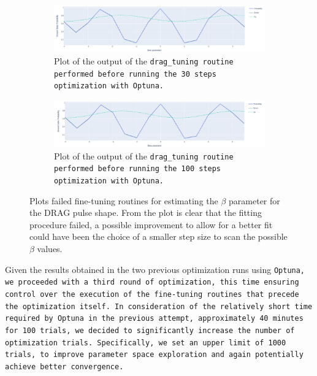 \begin{figure}[h!]
    \centering
    \begin{subfigure}[t]{\textwidth}
        \includegraphics[width=\textwidth]{figures/png/RB_optimization/beta30.png}
        \caption{Plot of the output of the \tt{drag\_tuning} routine performed before running the 30 steps optimization with \tt{Optuna}.}
        \label{fig:failed_beta:30}
    \end{subfigure}
    \vspace{0.3cm}
    \begin{subfigure}[t]{\textwidth}
        \includegraphics[width=\textwidth]{figures/png/RB_optimization/beta100.png}
        \caption{Plot of the output of the \tt{drag\_tuning} routine performed before running the 100 steps optimization with \tt{Optuna}.}
        \label{fig:failed_beta:100}
    \end{subfigure}

    \caption{Plots failed fine-tuning routines for estimating the $\beta$ parameter for the DRAG pulse shape. 
    From the plot is clear that the fitting procedure failed, a possible improvement to allow for a better fit could have been the choice of a smaller step size to scan the possible $\beta$ values.}
    \label{fig:failed_beta}
\end{figure}

Given the results obtained in the two previous optimization runs using \tt{Optuna}, we proceeded with a third round of optimization, this time ensuring control over the execution of the fine-tuning routines that precede the optimization itself. 
In consideration of the relatively short time required by \tt{Optuna} in the previous attempt, approximately 40 minutes for 100 trials, we decided to significantly increase the number of optimization trials. 
Specifically, we set an upper limit of 1000 trials, to improve parameter space exploration and again potentially achieve better convergence.

